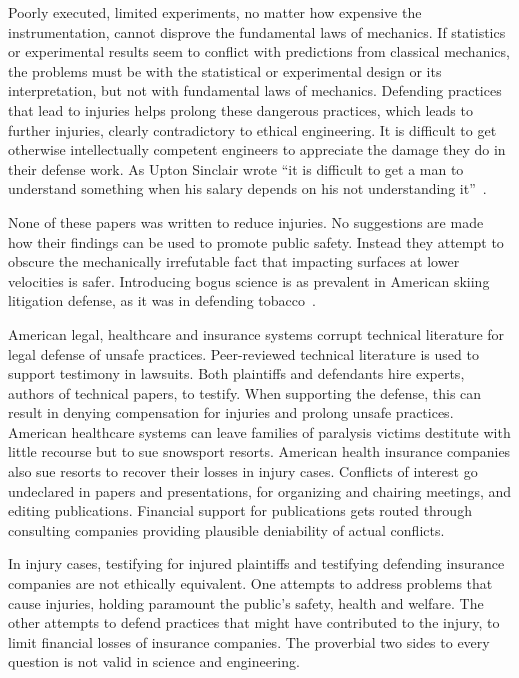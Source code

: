 \documentclass[smallextended]{svjour3}       %
\begin{document}
Poorly executed, limited experiments, no matter how expensive the
instrumentation, cannot disprove the fundamental laws of mechanics. If
statistics or experimental results seem to conflict with predictions from
classical mechanics, the problems must be with the statistical or experimental
design or its interpretation, but not with fundamental laws of mechanics.
Defending practices that lead to injuries helps prolong these dangerous
practices, which leads to further injuries, clearly contradictory to ethical
engineering. It is difficult to get otherwise intellectually competent
engineers to appreciate the damage they do in their defense work. As Upton
Sinclair wrote ``it is difficult to get a man to understand something when his
salary depends on his not understanding it''~\cite{Sinclair1994}.

None of these papers was written to reduce injuries. No suggestions are made
how their findings can be used to promote public safety. Instead they attempt
to obscure the mechanically irrefutable fact that impacting surfaces at lower
velocities is safer. Introducing bogus science is as prevalent in American
skiing litigation defense, as it was in defending tobacco~\cite{Oreskes2010}.

American legal, healthcare and insurance systems corrupt technical literature
for legal defense of unsafe practices. Peer-reviewed technical literature is
used to support testimony in lawsuits. Both plaintiffs and defendants hire
experts, authors of technical papers, to testify.  When supporting the defense,
this can result in denying compensation for injuries and prolong unsafe
practices. American healthcare systems can leave families of paralysis victims
destitute with little recourse but to sue snowsport resorts. American health
insurance companies also sue resorts to recover their losses in injury cases.
Conflicts of interest go undeclared in papers and presentations, for organizing
and chairing meetings, and editing publications. Financial support for
publications gets routed through consulting companies providing plausible
deniability of actual conflicts.

In injury cases, testifying for injured plaintiffs and testifying defending
insurance companies are not ethically equivalent. One attempts to address
problems that cause injuries, holding paramount the public's safety, health and
welfare. The other attempts to defend practices that might have contributed to
the injury, to limit financial losses of insurance companies. The proverbial
two sides to every question is not valid in science and engineering.
\end{document}
